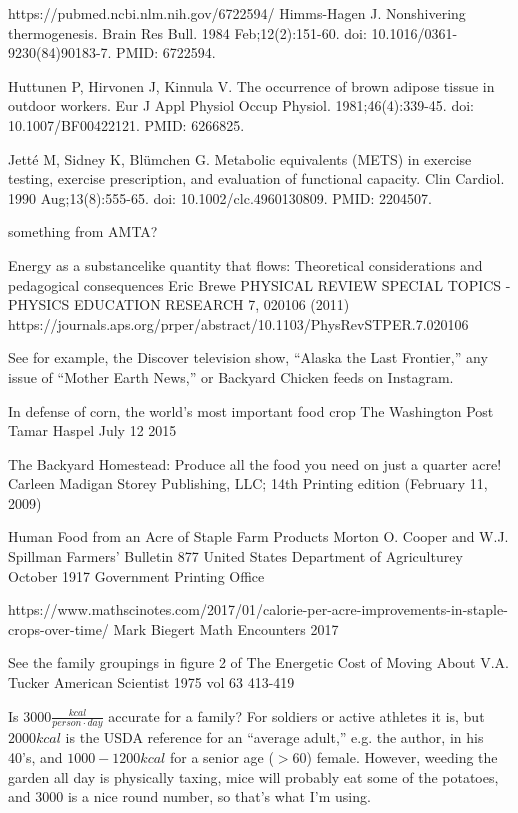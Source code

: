 \documentclass[12pt]{iopart}
\begin{document}
\begin{thebibliography}{99}
https://pubmed.ncbi.nlm.nih.gov/6722594/
Himms-Hagen J. Nonshivering thermogenesis. Brain Res Bull. 1984 Feb;12(2):151-60. 
doi: 10.1016/0361-9230(84)90183-7. PMID: 6722594.

Huttunen P, Hirvonen J, Kinnula V. 
The occurrence of brown adipose tissue in outdoor workers. 
Eur J Appl Physiol Occup Physiol. 
1981;46(4):339-45. 
doi: 10.1007/BF00422121. PMID: 6266825.

Jetté M, Sidney K, Blümchen G. Metabolic equivalents (METS) in exercise testing, exercise prescription, and evaluation of functional capacity. Clin Cardiol. 1990 Aug;13(8):555-65. doi: 10.1002/clc.4960130809. PMID: 2204507.

something from AMTA?

Energy as a substancelike quantity that flows: Theoretical considerations
and pedagogical consequences
Eric Brewe
PHYSICAL REVIEW SPECIAL TOPICS - PHYSICS EDUCATION RESEARCH 7, 020106 (2011)
https://journals.aps.org/prper/abstract/10.1103/PhysRevSTPER.7.020106

See for example, the Discover television show, ``Alaska the Last Frontier,'' any issue of ``Mother Earth News,'' or Backyard Chicken feeds on Instagram.  
 
 
In defense of corn, the world’s most important food crop
The Washington Post
Tamar Haspel 
July 12 2015

The Backyard Homestead: Produce all the food you need on just a quarter acre!
Carleen Madigan
Storey Publishing, LLC; 14th Printing edition (February 11, 2009)



Human Food from an Acre of Staple Farm Products
Morton O. Cooper and W.J. Spillman
Farmers' Bulletin 877
United States Department of Agriculturey
October 1917
Government Printing Office


https://www.mathscinotes.com/2017/01/calorie-per-acre-improvements-in-staple-crops-over-time/
Mark Biegert 
Math Encounters 
2017

See the family groupings in figure 2 of 
The Energetic Cost of Moving About
V.A. Tucker
American Scientist
1975
vol 63
413-419

 Is $3000\frac{kcal}{person\cdot day}$ accurate for a family?  For soldiers or active athletes it is, but $2000kcal$ is the USDA reference for an ``average adult,'' e.g. the author, in his 40's, and   $1000-1200kcal$ for a senior age ($>60$) female.  However, weeding the garden all day is physically taxing, mice will probably eat some of the potatoes, and $3000$ is a nice round number, so that's what I'm using.


\end{thebibliography}
\end{document}
